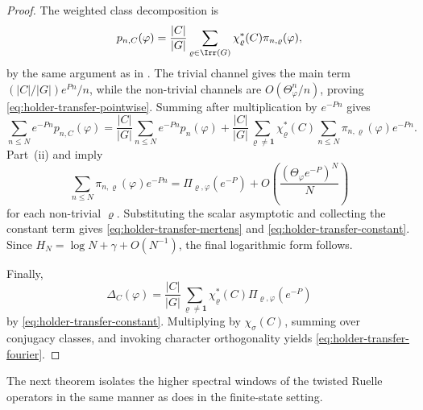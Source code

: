 \begin{proof}
  The weighted class decomposition is
  \[
    p_{n,C}(\varphi)
    =
    \frac{|C|}{|G|}
      \sum_{\varrho\in\Irr(G)}
        \chi_\varrho^\ast(C)\pi_{n,\varrho}(\varphi),
  \]
  by the same argument as in
  . The trivial channel gives
  the main term \((|C|/|G|)e^{Pn}/n\), while the non-trivial channels are
  \(O(\Theta_\varphi^n/n)\), proving
  \eqref{eq:holder-transfer-pointwise}. Summing after multiplication by
  \(e^{-Pn}\) gives
  \[
    \sum_{n\le N}e^{-Pn}p_{n,C}(\varphi)
    =
    \frac{|C|}{|G|}
      \sum_{n\le N}e^{-Pn}p_n(\varphi)
    +\frac{|C|}{|G|}
      \sum_{\varrho\neq\mathbf 1}\chi_\varrho^\ast(C)
        \sum_{n\le N}\pi_{n,\varrho}(\varphi)e^{-Pn}.
  \]
  Part~\textup{(ii)} and  imply
  \[
    \sum_{n\le N}\pi_{n,\varrho}(\varphi)e^{-Pn}
    =
    \Pi_{\varrho,\varphi}(e^{-P})
    +O\!\left(\frac{(\Theta_\varphi e^{-P})^N}{N}\right)
  \]
  for each non-trivial \(\varrho\). Substituting the scalar asymptotic
  and collecting the constant term gives
  \eqref{eq:holder-transfer-mertens} and
  \eqref{eq:holder-transfer-constant}. Since
  \(H_N=\log N+\gamma+O(N^{-1})\), the final logarithmic form follows.

  Finally,
  \[
    \Delta_C(\varphi)
    =
    \frac{|C|}{|G|}
      \sum_{\varrho\neq\mathbf 1}
        \chi_\varrho^\ast(C)\Pi_{\varrho,\varphi}(e^{-P})
  \]
  by \eqref{eq:holder-transfer-constant}. Multiplying by
  \(\chi_\sigma(C)\), summing over conjugacy classes, and invoking
  character orthogonality yields
  \eqref{eq:holder-transfer-fourier}.
\end{proof}

The next theorem isolates the higher spectral windows of the twisted
Ruelle operators in the same manner as
 does in the finite-state
setting.

